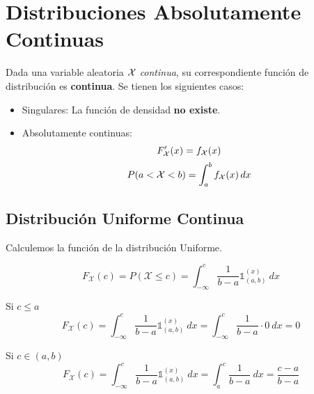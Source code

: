 \section{Distribuciones Absolutamente Continuas}
Dada una variable aleatoria $\mathcal{X}$ \textit{continua}, su correspondiente función de distribución es \textbf{continua}. Se tienen los siguientes casos:
\begin{itemize}
  \item Singulares: La función de densidad \textbf{no existe}. 
  \item Absolutamente continuas: \[F_{\mathcal{X}}'(x) = f_{\mathcal{X}}(x)\] \[P(a < \mathcal X < b) = \int_a^b f_{\mathcal{X}}(x)\,dx\]
\end{itemize}

\subsection{Distribución Uniforme Continua}


Calculemos la función de la distribución Uniforme.

\[F_{\mathcal X}(c) = P(\mathcal X \le c) = \int_{-\infty}^c \frac1{b-a} \mathbb 1_{(a,b)}^{(x)}~dx\]

Si $c \le a$
\[F_{\mathcal X}(c) = \int_{-\infty}^c \frac1{b-a} \mathbb 1_{(a,b)}^{(x)}~dx = \int_{-\infty}^c \frac1{b-a} \cdot 0~dx = 0\]

Si $c \in (a,b)$
\[F_{\mathcal X}(c) = \int_{-\infty}^c \frac1{b-a} \mathbb 1_{(a,b)}^{(x)}~dx = \int_{a}^c \frac1{b-a}~dx = \frac{c-a}{b-a} \]

